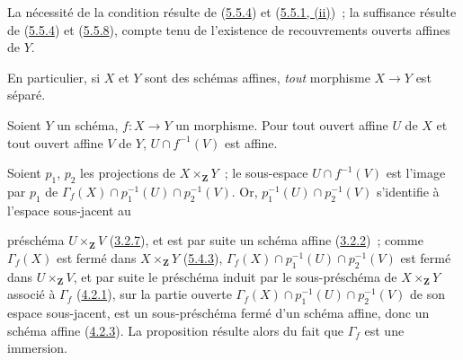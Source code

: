 La nécessité de la condition résulte de
(\hyperref[I.5.5.4-fr]{5.5.4}) et
(\hyperref[I.5.5.1-fr]{5.5.1, (ii)})~; la suffisance résulte de
(\hyperref[I.5.5.4-fr]{5.5.4}) et
(\hyperref[I.5.5.8-fr]{5.5.8}), compte tenu de l'existence de recouvrements
ouverts affines de $Y$.

En particulier, si $X$ et $Y$ sont des schémas affines, \emph{tout} morphisme
$X\to Y$ est séparé.

\begin{proposition}[5.5.10]
\label{I.5.5.10-fr}
Soient $Y$ un schéma, $f:X\to Y$ un morphisme. Pour tout ouvert affine $U$ de
$X$ et tout ouvert affine $V$ de $Y$, $U\cap f^{-1}(V)$ est affine.
\end{proposition}

Soient $p_1$, $p_2$ les projections de $X\times_{\mathbf{Z}}Y$~; le
sous-espace $U\cap f^{-1}(V)$ est l'image par $p_1$ de
$\Gamma_f(X)\cap p_1^{-1}(U)\cap p_2^{-1}(V)$. Or,
$p_1^{-1}(U)\cap p_2^{-1}(V)$ s'identifie à l'espace sous-jacent au

préschéma $U\times_{\mathbf{Z}}V$
(\hyperref[I.3.2.7-fr]{3.2.7}), et est par suite un schéma affine
(\hyperref[I.3.2.2-fr]{3.2.2})~; comme $\Gamma_f(X)$ est fermé dans
$X\times_{\mathbf{Z}}Y$ (\hyperref[I.5.4.3-fr]{5.4.3}),
$\Gamma_f(X)\cap p_1^{-1}(U)\cap p_2^{-1}(V)$ est fermé dans
$U\times_{\mathbf{Z}}V$, et par suite le préschéma induit par le
sous-préschéma de $X\times_{\mathbf{Z}}Y$ associé à $\Gamma_f$
(\hyperref[I.4.2.1-fr]{4.2.1}), sur la partie ouverte
$\Gamma_f(X)\cap p_1^{-1}(U)\cap p_2^{-1}(V)$ de son espace sous-jacent, est
un sous-préschéma fermé d'un schéma affine, donc un schéma affine
(\hyperref[I.4.2.3-fr]{4.2.3}). La proposition résulte alors du fait que
$\Gamma_f$ est une immersion.

